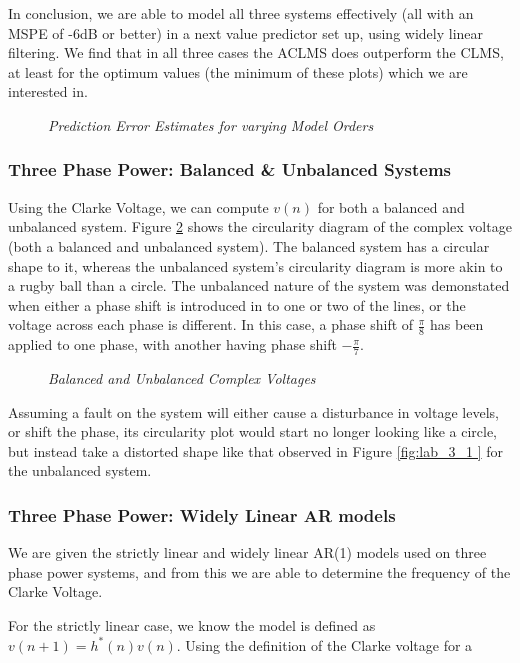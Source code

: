 \documentclass[./main.tex]{subfiles}
\begin{document}
In conclusion, we are able to model all three systems effectively (all with an MSPE of -6dB or better) in a next value predictor set up, using widely linear filtering. We find that in all three cases the ACLMS does outperform the CLMS, at least for the optimum values (the minimum of these plots) which we are interested in.

\begin{figure}[h]
	\centering
	\resizebox{\textwidth}{!}{}
	\caption{\textit{Prediction Error Estimates for varying Model Orders}}
	\label{fig:4_1_b_order}
\end{figure}

\subsubsection{Three Phase Power: Balanced \& Unbalanced Systems}

Using the Clarke Voltage, we can compute $v(n)$ for both a balanced and unbalanced system. Figure \ref{fig:4_1_c} shows the circularity diagram of the complex voltage (both a balanced and unbalanced system). The balanced system has a circular shape to it, whereas the unbalanced system's circularity diagram is more akin to a rugby ball than a circle. The unbalanced nature of the system was demonstated when either a phase shift is introduced in to one or two of the lines, or the voltage across each phase is different. In this case, a phase shift of $\frac{\pi}{8}$ has been applied to one phase, with another having phase shift $-\frac{\pi}{7}$.

\begin{figure}[h]
	\centering
	\resizebox{0.45\textwidth}{!}{}
	\caption{\textit{Balanced and Unbalanced Complex Voltages}}
	\label{fig:4_1_c}
\end{figure}

Assuming a fault on the system will either cause a disturbance in voltage levels, or shift the phase, its circularity plot would start no longer looking like a circle, but instead take a distorted shape like that observed in Figure \ref{fig:lab_3_1 } for the unbalanced system.


\subsubsection{Three Phase Power: Widely Linear AR models}
We are given the strictly linear and widely linear AR(1) models used on three phase power systems, and from this we are able to determine the frequency of the Clarke Voltage.

For the strictly linear case, we know the model is defined as $ v(n+1) = h^\ast (n) v(n) $. Using the definition of the Clarke voltage for a 
\end{document}
